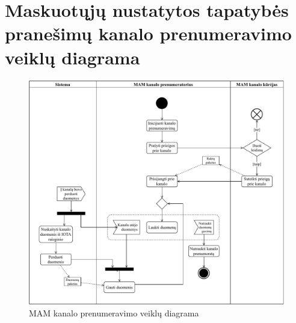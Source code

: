 \section{Maskuotųjų nustatytos tapatybės pranešimų kanalo prenumeravimo veiklų diagrama}
\begin{figure}[H]
    \centering
    \includegraphics[scale=0.7]{images/ad-2}
    \caption{MAM kanalo prenumeravimo veiklų diagrama}
\end{figure}

